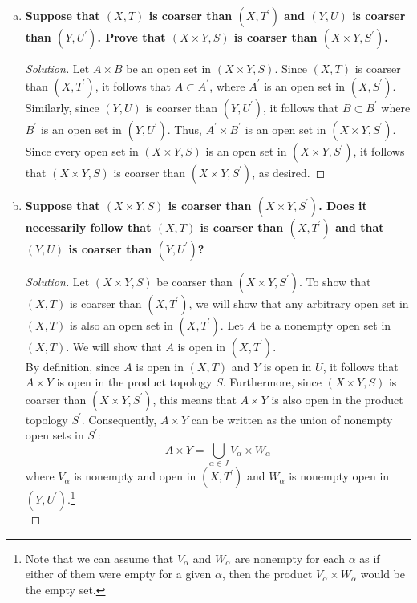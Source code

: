 \documentclass[11pt]{article}
\newenvironment{solution}
  {\renewcommand\qedsymbol{$\blacksquare$}\begin{proof}[Solution]}
  {\end{proof}}
\begin{document}
\begin{enumerate}[a)]
	\item \textbf{Suppose that $(X,T)$ is coarser than $(X, T^{\prime})$ and $(Y,U)$ is coarser than $(Y,U^{\prime})$. 
	Prove that $(X \times Y, S)$ is coarser than $(X \times Y, S^{\prime})$.}

	\begin{solution}
	Let $A \times B$ be an open set in $(X \times Y, S)$. Since $(X, T)$ is coarser than $(X, T^{\prime})$, it follows that $A \subset A^{\prime}$, where $A^{\prime}$ is an open
	set in $(X, S^{\prime})$. Similarly, since $(Y, U)$ is coarser than $(Y, U^{\prime})$, it follows that $B \subset B^{\prime}$ where $B^{\prime}$ is an open
	set in $(Y, U^{\prime})$. Thus, $A^{\prime} \times B^{\prime}$ is an open set in $(X \times Y, S^{\prime})$. Since every open set in $(X \times Y, S)$ is an open set in $(X \times Y, S^{\prime})$,
	it follows that $(X \times Y, S)$ is coarser than $(X \times Y, S^{\prime})$, as desired.
	\end{solution}
	
	\item \textbf{Suppose that $(X \times Y, S)$ is coarser than $(X \times Y, S^{\prime})$. 
	Does it necessarily follow that $(X, T)$ is coarser than $(X, T^{\prime})$ and that $(Y, U)$ is coarser than $(Y, U^{\prime})$?}

	\begin{solution}
	Let $(X \times Y, S)$ be coarser than $(X \times Y, S^{\prime})$. To show that $(X, T)$ is coarser than $(X, T^{\prime})$, we will show that any arbitrary open set in $(X, T)$ is also an open set in $(X, T^{\prime})$. 
	Let $A$ be a nonempty open set in $(X, T)$. We will show that $A$ is open in $(X, T^{\prime})$. \\

	By definition, since $A$ is open in $(X, T)$ and $Y$ is open in $U$, it follows that $A \times Y$ is open in the product topology $S$. Furthermore, since $(X \times Y, S)$ is coarser than $(X \times Y, S^{\prime})$, this means that
	$A \times Y$ is also open in the product topology $S^{\prime}$. Consequently, $A \times Y$ can be written as the union of nonempty open sets in $S^{\prime}$:
	\[
		A \times Y = \bigcup\limits_{\alpha \in J} V_{\alpha} \times W_{\alpha}
	\]
	where $V_{\alpha}$ is nonempty and open in $(X, T^{\prime})$ and $W_{\alpha}$ is nonempty open in $(Y, U^{\prime})$.\footnote{Note that we can assume that $V_\alpha$ and $W_\alpha$ are nonempty for each $\alpha$ as if either of them 
	were empty for a given $\alpha$, then the product $V_\alpha \times W_\alpha$ would be the empty set.} \\


\end{solution}
\end{enumerate}
\end{document}
